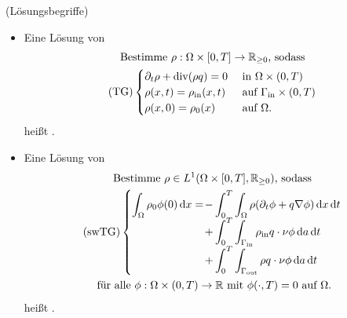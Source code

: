 \begin{define}(Lösungsbegriffe)
	
	\begin{itemize}
		\item Eine Lösung von
		\begin{gather*}
		\text{Bestimme } \rho: \Omega \times [0,T] \to \mathbb{R}_{\geq 0} \text{, sodass}\\
		\operatorname{(TG)}
		\begin{cases}
		\partial_t \rho + \operatorname{div}(\rho q) = 0 &\text{ in } \Omega \times (0,T)\\
		\rho(x,t) = \rho_{\text{in}}(x,t) &\text{ auf } \Gamma_{{\text{in}}} \times (0,T)\\
		\rho(x,0) = \rho_0(x) &\text{ auf } \Omega.
		\end{cases}
		\end{gather*}
		heißt .
		\item Eine Lösung von 
		\begin{gather*} 
		\text{Bestimme } \rho \in L^1(\Omega \times [0,T], \R_{\geq 0}) \text{, sodass}\\
		\swlTG
		\begin{cases}
		\displaystyle
		\int_{\Omega} \rho_0 \phi(0) \diff x = \mkern-16mu &- \displaystyle \int_{0}^{T} \int_{\Omega} \rho (\partial_t \phi + q \nabla \phi ) \diff x \diff t \\
		&+\displaystyle\int_{0}^{T}  \int_{\Gammain} \rhoin q \cdot \nu \phi \diff a  \diff t \\
		&+\displaystyle\int_{0}^{T}  \int_{\Gammaout} \rho q \cdot \nu \phi \diff a  \diff t
		\end{cases}	\\
		\text{ für alle } \phi: \Omega \times (0,T) \to \R \text{ mit } \phi(\cdot,T) = 0 \text{ auf } \Omega.
		\end{gather*}
		heißt .
	\end{itemize}
\end{define}


